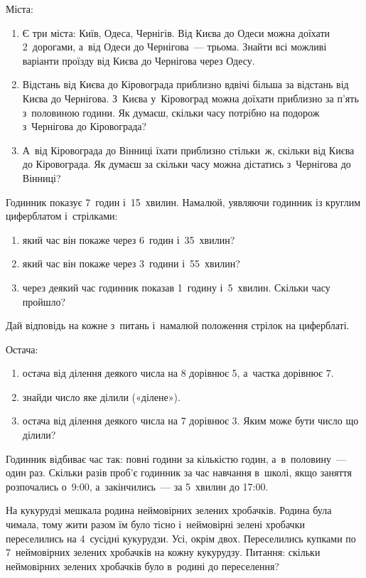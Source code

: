 \problem
Міста:
\begin{enumerate}
    \item Є три міста: Київ, Одеса, Чернігів.
    Від Києва до Одеси можна доїхати 2~дорогами,
    а~від Одеси до Чернігова~--- трьома.
    Знайти всі можливі варіанти проїзду від Києва до Чернігова через Одесу.
    \item Відстань від Києва до Кіровограда приблизно вдвічі більша
    за відстань від Києва до Чернігова.
    З~Києва у~Кіровоград можна доїхати приблизно за п'ять з~половиною години.
    Як думаєш, скільки часу потрібно на подорож з~Чернігова до Кіровограда?
    \item А~від Кіровограда до Вінниці їхати приблизно стільки~ж,
    скільки від Києва до Кіровограда.
    Як думаєш за скільки часу можна дістатись з~Чернігова до Вінниці?
\end{enumerate}


\problem
Годинник показує 7~годин і~15~хвилин.
Намалюй, уявляючи годинник із круглим циферблатом і~стрілками:
\begin{enumerate}
    \item який час він покаже через 6~годин і~35~хвилин?
    \item який час він покаже через 3~години і~55~хвилин?
    \item через деякий час годинник показав 1~годину і~5~хвилин.
    Скільки часу пройшло?
\end{enumerate}
Дай відповідь на кожне з~питань і~намалюй положення стрілок на циферблаті.


\problem
Остача:
\begin{enumerate}
    \item остача від ділення деякого числа на 8 дорівнює 5,
    а~частка дорівнює 7.
    \item знайди число яке ділили («ділене»).
    \item остача від ділення деякого числа на 7 дорівнює 3.
    Яким може бути число що ділили?
\end{enumerate}


\problem
Годинник відбиває час так: повні години за кількістю годин,
а~в~половину~--- один раз.
Скільки разів проб’є годинник за час навчання в~школі,
якщо заняття розпочались о~9:00, а~закінчились~--- за 5~хвилин до 17:00.


\problem
На кукурудзі мешкала родина неймовірних зелених хробачків.
Родина була чимала, тому жити разом їм було тісно і~неймовірні
зелені хробачки переселились на 4~сусідні кукурудзи. Усі, окрім двох.
Переселились купками по 7~неймовірних зелених хробачків на кожну кукурудзу.
Питання: скільки неймовірних зелених хробачків було в~родині до переселення?


